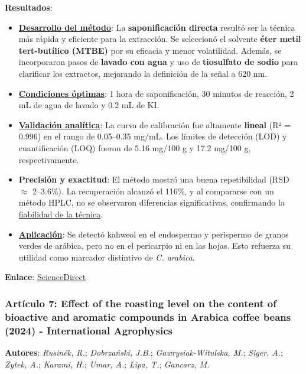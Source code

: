 \documentclass{article}
\begin{document}
\textbf{Resultados}:  
\begin{itemize}
	\item \underline{\textbf{Desarrollo del método}}: La \textbf{saponificación directa} resultó ser la técnica más rápida y eficiente para la extracción. Se seleccionó el solvente \textbf{éter metil tert-butílico (MTBE)} por su eficacia y menor volatilidad. Además, se incorporaron pasos de \textbf{lavado con agua} y uso de \textbf{tiosulfato de sodio} para clarificar los extractos, mejorando la definición de la señal a 620 nm.  
	\item \underline{\textbf{Condiciones óptimas}}: 1 hora de saponificación, 30 minutos de reacción, 2 mL de agua de lavado y 0.2 mL de KI.  
	\item \underline{\textbf{Validación analítica}}: La curva de calibración fue altamente \textbf{lineal} (R² = 0.996) en el rango de 0.05–0.35 mg/mL. Los límites de detección (LOD) y cuantificación (LOQ) fueron de 5.16 mg/100 g y 17.2 mg/100 g, respectivamente.  
	\item \textbf{Precisión y exactitud}: El método mostró una buena repetibilidad (RSD $\approx$ 2–3.6\%). La recuperación alcanzó el 116\%, y al compararse con un método HPLC, no se observaron diferencias significativas, confirmando la \underline{fiabilidad de la técnica}.  
	\item \underline{\textbf{Aplicación}}: Se detectó kahweol en el endospermo y perispermo de granos verdes de arábica, pero no en el pericarpio ni en las hojas. Esto refuerza su utilidad como marcador distintivo de \textit{C. arabica}.  
\end{itemize} \vspace{0.5cm}

\textbf{Enlace}: \href{https://doi.org/10.1016/j.jfca.2013.04.001}{ScienceDirect} \vspace{0.5cm}


\subsubsection{\textbf{Artículo 7:} \textcolor{cinereous}{\textbf{Effect of the roasting level on the content of bioactive and aromatic compounds in Arabica coffee beans (2024) - International Agrophysics}}} \vspace{0.5cm}

\textbf{Autores}: \textit{Rusin\'ek, R.}; \textit{Dobrza\'nski, J.B.}; \textit{Gawrysiak-Witulska, M.}; \textit{Siger, A.}; \textit{Zytek, A.}; \textit{Karami, H.}; \textit{Umar, A.}; \textit{Lipa, T.}; \textit{Gancarz, M.} \vspace{0.5cm}
\end{document}

